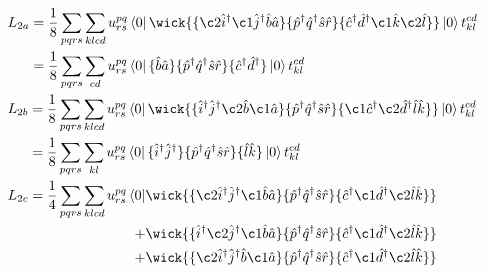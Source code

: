\begin{align}
    &\begin{aligned}
        L_{2a}
        &= \frac{1}{8}\sum_{pqrs} \sum_{klcd} u^{pq}_{rs} \bra{0}
            \wick{
            \{\c2{\hat{i}}^\dagger \c1{\hat{j}}^\dagger \hat{b} \hat{a} \}
            \{\hat{p}^\dagger \hat{q}^\dagger \hat{s} \hat{r} \}
            \{\hat{c}^\dagger \hat{d}^\dagger \c1{\hat{k}} \c2{\hat{l}} \}
            }
            \ket{0}t^{cd}_{kl} \\
        &= \frac{1}{8}\sum_{pqrs} \sum_{cd} u^{pq}_{rs} \bra{0}
            \{ \hat{b} \hat{a} \}
            \{\hat{p}^\dagger \hat{q}^\dagger \hat{s} \hat{r} \}
            \{ \hat{c}^\dagger \hat{d}^\dagger \}
            \ket{0}t^{cd}_{kl}
    \end{aligned} \\
    &\begin{aligned}
        L_{2b}
        &= \frac{1}{8}\sum_{pqrs} \sum_{klcd} u^{pq}_{rs} \bra{0}
            \wick{
            \{\hat{i}^\dagger \hat{j}^\dagger \c2{\hat{b}} \c1{\hat{a}} \}
            \{\hat{p}^\dagger \hat{q}^\dagger \hat{s} \hat{r} \}
            \{\c1{\hat{c}}^\dagger \c2{\hat{d}}^\dagger \hat{l} \hat{k} \}
            }
            \ket{0}t^{cd}_{kl} \\
        &= \frac{1}{8}\sum_{pqrs} \sum_{kl} u^{pq}_{rs} \bra{0}
            \{\hat{i}^\dagger \hat{j}^\dagger \}
            \{\hat{p}^\dagger \hat{q}^\dagger \hat{s} \hat{r} \}
            \{\hat{l} \hat{k} \}
            \ket{0}t^{cd}_{kl}
    \end{aligned} \\
    &\begin{aligned}
        L_{2c}
            = \frac{1}{4}\sum_{pqrs} \sum_{klcd} u^{pq}_{rs} \bra{0}
            &\wick{
            \{\c2{\hat{i}}^\dagger \hat{j}^\dagger \c1{\hat{b}} \hat{a} \}
            \{\hat{p}^\dagger \hat{q}^\dagger \hat{s} \hat{r} \}
            \{\hat{c}^\dagger \c1{\hat{d}^\dagger} \c2{\hat{l}} \hat{k} \}
            } \\
            +
            &\wick{
            \{\hat{i}^\dagger \c2{\hat{j}}^\dagger \c1{\hat{b}} \hat{a} \}
            \{\hat{p}^\dagger \hat{q}^\dagger \hat{s} \hat{r} \}
            \{\hat{c}^\dagger \c1{\hat{d}^\dagger} \c2{\hat{l}} \hat{k} \}
            } \\
            +
            &\wick{
            \{\c2{\hat{i}}^\dagger \hat{j}^\dagger \hat{b} \c1{\hat{a}} \}
            \{\hat{p}^\dagger \hat{q}^\dagger \hat{s} \hat{r} \}
            \{\hat{c}^\dagger \c1{\hat{d}^\dagger} \c2{\hat{l}} \hat{k} \}
}
\end{aligned}
\end{align}
